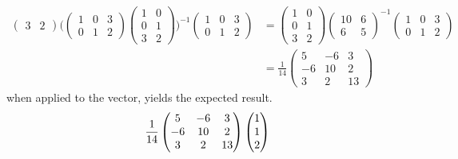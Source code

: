 \begin{exercises}
\begin{answer}
\begin{exparts}
\begin{align*}
\begin{pmatrix}
              3  &2
            \end{pmatrix}
            \bigl(
              \begin{pmatrix}
                1  &0  &3 \\
                0  &1  &2 
              \end{pmatrix}
              \begin{pmatrix}
                1  &0 \\
                0  &1 \\
                3  &2
              \end{pmatrix}
            \bigr)^{-1}
            \begin{pmatrix}
              1  &0  &3 \\
              0  &1  &2 
            \end{pmatrix}
            &=
            \begin{pmatrix}
              1  &0 \\
              0  &1 \\
              3  &2
            \end{pmatrix}
              \begin{pmatrix}
                10  &6  \\
                6   &5
              \end{pmatrix}^{-1}
            \begin{pmatrix}
              1  &0  &3 \\
              0  &1  &2 
            \end{pmatrix}                                     \\
            &=
            \frac{1}{14}
            \begin{pmatrix}
              5  &-6 &3  \\
             -6  &10 &2  \\
              3  &2  &13
            \end{pmatrix}
          \end{align*}
          when applied to the vector, yields the expected result.
          \begin{equation*}
            \frac{1}{14}
            \begin{pmatrix}
              5  &-6 &3  \\
             -6  &10 &2  \\
              3  &2  &13
            \end{pmatrix}
            \colvec{1 \\ 1 \\ 2}

\end{equation*}
\end{exparts}
\end{answer}
\end{exercises}
